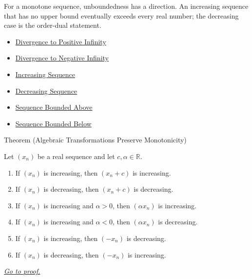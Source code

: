 \begin{remark*}[Interpretation]
For a monotone sequence, unboundedness has a direction. An increasing sequence
that has no upper bound eventually exceeds every real number; the decreasing
case is the order-dual statement.
\end{remark*}

\begin{dependencies}
\begin{itemize}
  \item \hyperref[def:diverges-to-positive-infinity]{Divergence to Positive Infinity}
  \item \hyperref[def:diverges-to-negative-infinity]{Divergence to Negative Infinity}
  \item \hyperref[def:increasing-sequence]{Increasing Sequence}
  \item \hyperref[def:decreasing-sequence]{Decreasing Sequence}
  \item \hyperref[def:sequence-bounded-above]{Sequence Bounded Above}
  \item \hyperref[def:sequence-bounded-below]{Sequence Bounded Below}
\end{itemize}
\end{dependencies}


\begin{theorembox}{Theorem (Algebraic Transformations Preserve Monotonicity)}
\begin{theorem}
\label{thm:algebraic-transformations-preserve-monotonicity}
Let $(x_n)$ be a real sequence and let $c,\alpha\in\mathbb{R}$.
\begin{enumerate}[label=(\alph*)]
  \item If $(x_n)$ is increasing, then $(x_n+c)$ is increasing.
  \item If $(x_n)$ is decreasing, then $(x_n+c)$ is decreasing.
  \item If $(x_n)$ is increasing and $\alpha>0$, then $(\alpha x_n)$ is increasing.
  \item If $(x_n)$ is increasing and $\alpha<0$, then $(\alpha x_n)$ is decreasing.
  \item If $(x_n)$ is increasing, then $(-x_n)$ is decreasing.
  \item If $(x_n)$ is decreasing, then $(-x_n)$ is increasing.
\end{enumerate}

\smallskip
\noindent
\hyperref[prf:algebraic-transformations-preserve-monotonicity]{\textit{Go to proof.}}
\end{theorem}
\end{theorembox}

